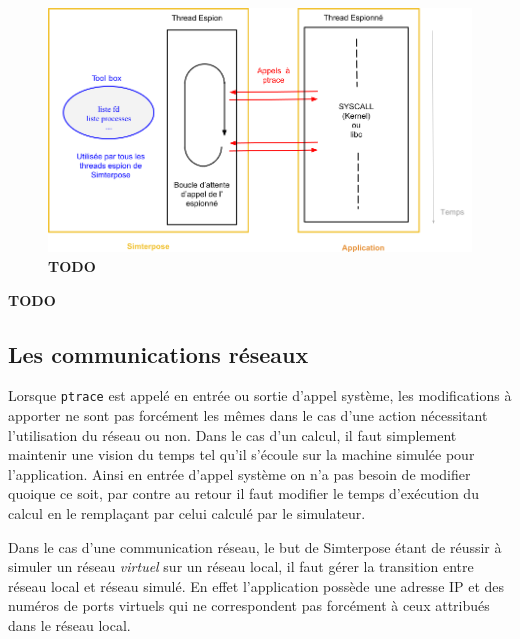 \begin{figure}[H]
  \centering \includegraphics[scale=0.5]{Pictures/png/Simterpose_orga_code_v3}
  \caption{{\color{red} \textbf{TODO}}}
  \label{Organisation_Simterpose}
\end{figure}

{\color{red} \textbf{TODO}}

\subsection{Les communications réseaux}

Lorsque \texttt{ptrace} est appelé en entrée ou sortie d'appel système, les modifications
à apporter ne sont pas forcément les mêmes dans le cas d'une action nécessitant
l'utilisation du réseau ou non. Dans le cas d'un calcul, il faut simplement
maintenir une vision du temps tel qu'il s'écoule sur la machine simulée pour
l'application. Ainsi en entrée d'appel système on n'a pas besoin de modifier
quoique ce soit, par contre au retour il faut modifier le temps d'exécution du
calcul en le remplaçant par celui calculé par le simulateur.

Dans le cas d'une communication réseau, le but de Simterpose étant de réussir à
simuler un réseau \textit{virtuel} sur un réseau local, il faut gérer la
transition entre réseau local et réseau simulé. En effet l'application possède
une adresse IP et des numéros de ports virtuels qui ne correspondent pas
forcément à ceux attribués dans le réseau local.


